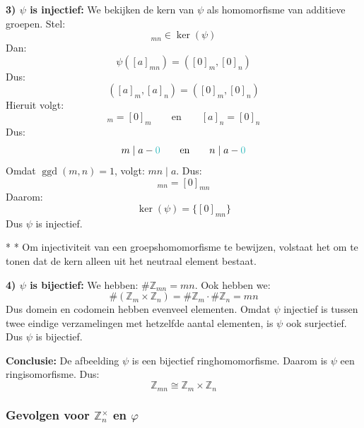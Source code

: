 \textbf{3) $\psi$ is injectief:} We bekijken de kern van $\psi$ als homomorfisme van additieve groepen. Stel:
\begin{equation*}
    [a]_{mn}\in\ker(\psi)
\end{equation*}
Dan:
\begin{equation*}
    \psi([a]_{mn})=([0]_m,[0]_n)
\end{equation*}
Dus:
\begin{equation*}
    ([a]_m,[a]_n)=([0]_m,[0]_n)
\end{equation*}
Hieruit volgt:
\begin{equation*}
    [a]_m=[0]_m \qquad \text{en} \qquad [a]_n=[0]_n
\end{equation*}
Dus:
\begin{equation*}
    m\mid a - \textcolor{Aquamarine}{0} \qquad \text{en} \qquad n\mid a - \textcolor{Aquamarine}{0}
\end{equation*}
Omdat $\operatorname{ggd}(m,n)=1$, volgt: $mn\mid a$. Dus:
\begin{equation*}
    [a]_{mn}=[0]_{mn}
\end{equation*}
Daarom:
\begin{equation*}
    \ker(\psi)=\{[0]_{mn}\}
\end{equation*}
Dus $\psi$ is injectief.

\begin{nicenote}*
    \nextpart[]*
    Om injectiviteit van een groepshomomorfisme te bewijzen, volstaat het om te tonen dat de kern alleen uit het neutraal element bestaat.
\end{nicenote}

\textbf{4) $\psi$ is bijectief:} We hebben: $\#\mathbb{Z}_{mn}=mn$. Ook hebben we:
\begin{equation*}
    \#(\mathbb{Z}_m\times\mathbb{Z}_n) = \#\mathbb{Z}_m\cdot \#\mathbb{Z}_n = mn
\end{equation*}
Dus domein en codomein hebben evenveel elementen. Omdat $\psi$ injectief is tussen twee eindige verzamelingen met hetzelfde aantal elementen, is $\psi$ ook surjectief. Dus $\psi$ is bijectief.

\textbf{Conclusie:} De afbeelding $\psi$ is een bijectief ringhomomorfisme. Daarom is $\psi$ een ringisomorfisme.
Dus: 
\begin{equation*}
    \mathbb{Z}_{mn}\cong \mathbb{Z}_m\times \mathbb{Z}_n
\end{equation*}

\subsubsection{Gevolgen voor \texorpdfstring{$\mathbb{Z}_n^{\times}$}{Znx} en \texorpdfstring{$\varphi$}{phi}}

